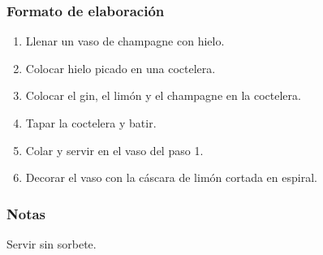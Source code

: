 \subsubsection{Formato de elaboraci\'on} 
\label{sec:title}
\bigskip 
\begin{center}
\begin{enumerate}
\item Llenar un vaso de champagne con hielo.
\item Colocar hielo picado en una coctelera.
\item Colocar el gin, el lim\'on y el champagne en la coctelera.
\item Tapar la coctelera y batir.
\item Colar y servir en el vaso del paso 1.
\item Decorar el vaso con la c\'ascara de lim\'on cortada en espiral.
\end{enumerate}
\end{center}
\bigskip \bigskip 
\bigskip 

\subsubsection{Notas}
\bigskip 
\begin{center}
\raggedright{}Servir sin sorbete.
\end{center} 
\bigskip \bigskip \bigskip 
